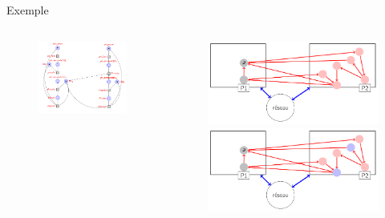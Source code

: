 \begin{frame}{Exemple}
\begin{columns}
\begin{column}{0.4\textwidth}
\begin{figure}
{					\includegraphics[width=\linewidth]{resources/testpetri7}
				}
			\end{figure}			
		\end{column}
	
		\begin{column}{0.5\textwidth}
			\begin{figure}
				\centering
				{
					\includegraphics[width=\linewidth]{resources/DRDP1}
				}
				\only<9-9>
				{
					\includegraphics[width=\linewidth]{resources/DRDP2}
				}
				
			\end{figure}			
		\end{column}
	\end{columns}
\end{frame}



